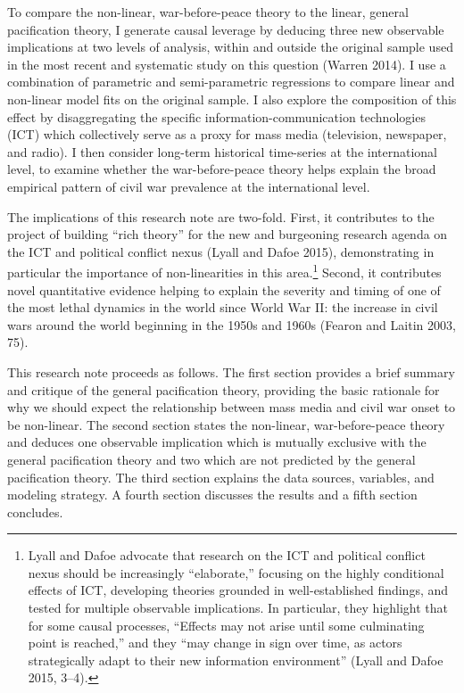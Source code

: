 \documentclass[11pt,article,oneside]{memoir}
\begin{document}
To compare the non-linear, war-before-peace theory to the linear,
general pacification theory, I generate causal leverage by deducing
three new observable implications at two levels of analysis, within and
outside the original sample used in the most recent and systematic study
on this question (Warren 2014). I use a combination of parametric and
semi-parametric regressions to compare linear and non-linear model fits
on the original sample. I also explore the composition of this effect by
disaggregating the specific information-communication technologies (ICT)
which collectively serve as a proxy for mass media (television,
newspaper, and radio). I then consider long-term historical time-series
at the international level, to examine whether the war-before-peace
theory helps explain the broad empirical pattern of civil war prevalence
at the international level.

The implications of this research note are two-fold. First, it
contributes to the project of building ``rich theory'' for the new and
burgeoning research agenda on the ICT and political conflict nexus
(Lyall and Dafoe 2015), demonstrating in particular the importance of
non-linearities in this area.\footnote{Lyall and Dafoe advocate that
  research on the ICT and political conflict nexus should be
  increasingly ``elaborate,'' focusing on the highly conditional effects
  of ICT, developing theories grounded in well-established findings, and
  tested for multiple observable implications. In particular, they
  highlight that for some causal processes, ``Effects may not arise
  until some culminating point is reached,'' and they ``may change in
  sign over time, as actors strategically adapt to their new information
  environment'' (Lyall and Dafoe 2015, 3--4).} Second, it contributes
novel quantitative evidence helping to explain the severity and timing
of one of the most lethal dynamics in the world since World War II: the
increase in civil wars around the world beginning in the 1950s and 1960s
(Fearon and Laitin 2003, 75).

This research note proceeds as follows. The first section provides a
brief summary and critique of the general pacification theory, providing
the basic rationale for why we should expect the relationship between
mass media and civil war onset to be non-linear. The second section
states the non-linear, war-before-peace theory and deduces one
observable implication which is mutually exclusive with the general
pacification theory and two which are not predicted by the general
pacification theory. The third section explains the data sources,
variables, and modeling strategy. A fourth section discusses the results
and a fifth section concludes.
\end{document}
